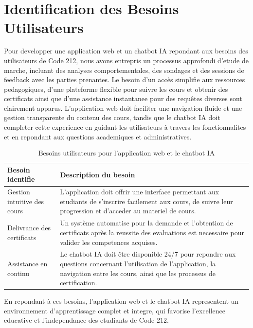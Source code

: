 \documentclass[a4paper, 11pt, openany]{report}
\begin{document}
\section{Identification des Besoins Utilisateurs}
Pour developper une application web et un chatbot IA repondant aux besoins des utilisateurs de Code 212, nous avons entrepris un processus approfondi d'etude de marche, incluant des analyses comportementales, des sondages et des sessions de feedback avec les parties prenantes. Le besoin d'un accès simplifie aux ressources pedagogiques, d'une plateforme flexible pour suivre les cours et obtenir des certificats ainsi que d'une assistance instantanee pour des requêtes diverses sont clairement apparus. L'application web doit faciliter une navigation fluide et une gestion transparente du contenu des cours, tandis que le chatbot IA doit completer cette experience en guidant les utilisateurs à travers les fonctionnalites et en repondant aux questions academiques et administratives.

\begin{table}[htp]
\caption{Besoins utilisateurs pour l'application web et le chatbot IA}
\centering
\begin{tabular}{|m{4cm}|m{12cm}|}
\hline
\textbf{Besoin identifie} & \textbf{Description du besoin} \\ \hline
Gestion intuitive des cours & L'application doit offrir une interface permettant aux etudiants de s'inscrire facilement aux cours, de suivre leur progression et d'acceder au materiel de cours. \\ \hline
Delivrance des certificats & Un système automatise pour la demande et l'obtention de certificats après la reussite des evaluations est necessaire pour valider les competences acquises. \\ \hline
Assistance en continu & Le chatbot IA doit être disponible 24/7 pour repondre aux questions concernant l'utilisation de l'application, la navigation entre les cours, ainsi que les processus de certification. \\ \hline
\end{tabular}
\label{tab:user_needs}
\end{table}

En repondant à ces besoins, l'application web et le chatbot IA representent un environnement d'apprentissage complet et integre, qui favorise l'excellence educative et l'independance des etudiants de Code 212.
\end{document}
